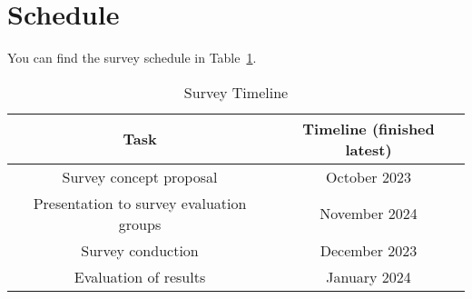 \documentclass[%
class=scrreprt,
chapterprefix=false,%
open=right,%
twoside=false,%
paper=a4,%
logofile={Logo\_zentral\_farbig\_EN.png},%
thesistype=masterproposal,%
UKenglish,%
]{se2thesis}
\begin{document}


\section{Schedule}
You can find the survey schedule in Table~\ref{tab:survey-timeline}.

\begin{table}[ht]
	\centering
	\begin{tabular}{|c|c|}
		\hline
		\textbf{Task} & \textbf{Timeline (finished latest)} \\
		\hline
		Survey concept proposal & October 2023 \\
		\hline
		Presentation to survey evaluation groups & November 2024 \\
		\hline
		Survey conduction & December 2023 \\
		\hline
		Evaluation of results & January 2024 \\
		\hline
	\end{tabular}
	\caption{Survey Timeline}
	\label{tab:survey-timeline}
\end{table}
\end{document}
